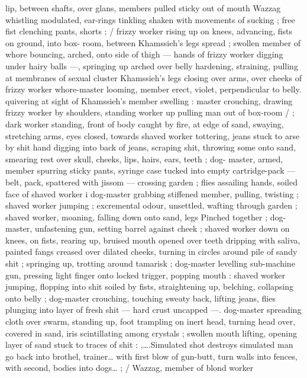 lip, between shafts, over glans, members pulled sticky out of mouth 
Wazzag whistling modulated, ear-rings tinkling shaken with 
movements of sucking ; free fist clenching pants, shorts ; {\slash} frizzy 
worker rising up on knees, advancing, fists on ground, into box- 
room, between Khamssieh's legs spread ; swollen member of whore 
bouncing, arched, onto side of thigh --- hands of frizzy worker 
digging under hairy balls ---, springing up arched over belly 
hardening, straining, pulling at membranes of sexual cluster 
Khamssieh's legs closing over arms, over cheeks of frizzy worker 
whore-master looming, member erect, violet, perpendicular to belly. 
quivering at sight of Khamssieh's member swelling : master 
crouching, drawing frizzy worker by shoulders, standing worker up 
pulling man out of box-room {\slash} ; dark worker standing, front of body 
caught by fire, at edge of sand, swaying, stretching arms, eyes 
closed, towards shaved worker tottering, jeans stuck to arse by shit 
hand digging into back of jeans, scraping shit, throwing some onto 
sand, smearing rest over skull, cheeks, lips, hairs, ears, teeth ; dog- 
master, armed, member spurring sticky pants, syringe case tucked 
into empty cartridge-pack --- belt, pack, spattered with jissom --- 
crossing garden ; flies assailing hands, soiled face of shaved worker 
i dog-master grabbing stiffened member, pulling, twisting ; shaved 
worker jumping ; excremental odour, unsettled, wafting through 
garden ; shaved worker, moaning, falling down onto sand, legs 
Pinched together ; dog-master, unfastening gun, setting barrel 
against cheek ; shaved worker down on knees, on fists, rearing up, 
bruised mouth opened over teeth dripping with saliva, painted fangs 
creased over dilated cheeks, turning in circles around pile of sandy 
shit ; springing up, trotting around tamarisk ; dog-master levelling 
sub-machine gun, pressing light finger onto locked trigger, popping 
mouth : shaved worker jumping, flopping into shit soiled by fists, 
straightening up, belching, collapsing onto belly ; dog-master 
crouching, touching sweaty back, lifting jeans, flies plunging into 
layer of fresh shit --- hard crust uncapped ---. dog-master spreading 
cloth over swarm, standing up, foot trampling on inert head, turning 
head over, covered in sand, iris scintillating among crystals ; swollen 
mouth lifting, opening layer of sand stuck to traces of shit : 
{\gl},{\ldots}.Simulated shot destroys simulated man{\td} go back into brothel, 
trainer{\ldots} with first blow of gun-butt, turn walls into fences, with 
second, bodies into dogs{\ldots}{\td} {\gr} ; {\slash} Wazzag, member of blond worker 
